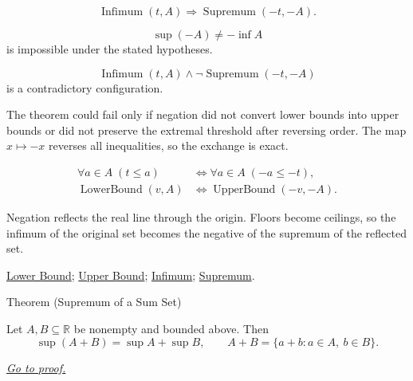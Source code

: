 \begin{remark*}
\[
\operatorname{Infimum}(t,A)
\Longrightarrow
\operatorname{Supremum}(-t,-A).
\]
\end{remark*}

\begin{remark*}
\[
\sup(-A)\ne -\inf A
\]
is impossible under the stated hypotheses.
\end{remark*}

\begin{remark*}
\[
\operatorname{Infimum}(t,A)\land \neg\operatorname{Supremum}(-t,-A)
\]
is a contradictory configuration.
\end{remark*}

\begin{remark*}
The theorem could fail only if negation did not convert lower bounds into upper bounds or did not preserve the extremal threshold after reversing order. The map $x\mapsto -x$ reverses all inequalities, so the exchange is exact.
\end{remark*}

\begin{remark*}
\[
\begin{aligned}
\forall a\in A\;(t\le a)
&\Longleftrightarrow
\forall a\in A\;(-a\le -t),\\
\operatorname{LowerBound}(v,A)
&\Longleftrightarrow
\operatorname{UpperBound}(-v,-A).
\end{aligned}
\]
\end{remark*}

\begin{remark*}[Interpretation]
Negation reflects the real line through the origin. Floors become ceilings, so the infimum of the original set becomes the negative of the supremum of the reflected set.
\end{remark*}

\begin{remark*}[Dependencies]
\hyperref[def:lower-bound]{Lower Bound};
\hyperref[def:upper-bound]{Upper Bound};
\hyperref[def:infimum]{Infimum};
\hyperref[def:supremum]{Supremum}.
\end{remark*}





\begin{theorembox}{Theorem (Supremum of a Sum Set)}
\begin{theorem}
\label{thm:supremum-sum-set}
Let $A,B\subseteq\mathbb{R}$ be nonempty and bounded above. Then
\[
  \sup(A+B)=\sup A+\sup B,
  \qquad
  A+B=\{a+b:a\in A,\ b\in B\}.
\]

\smallskip
\noindent
\hyperref[prf:supremum-sum-set]{\textit{Go to proof.}}
\end{theorem}
\end{theorembox}

